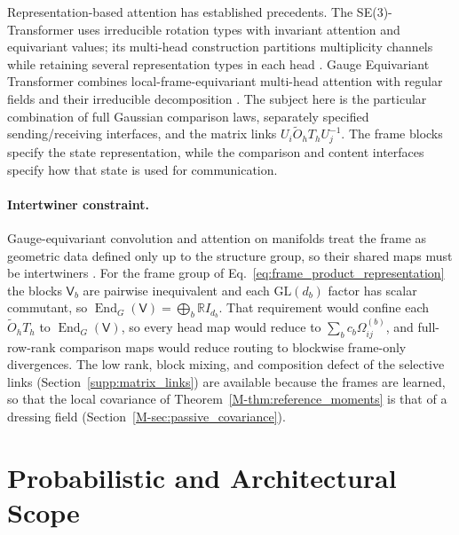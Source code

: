 \documentclass[twoside,11pt]{article}
\begin{document}
Representation-based attention has established precedents. The SE(3)-Transformer uses irreducible rotation types with invariant attention and equivariant values; its multi-head construction partitions multiplicity channels while retaining several representation types in each head \citep[Secs.~2.3 and 3.2, App.~D.3]{fuchs2020se3}. Gauge Equivariant Transformer combines local-frame-equivariant multi-head attention with regular fields and their irreducible decomposition \citep[Secs.~4.1--4.2]{He2021GaugeEquivariantTransformer}. The subject here is the particular combination of full Gaussian comparison laws, separately specified sending/receiving interfaces, and the matrix links $U_i\widetilde O_hT_hU_j^{-1}$. The frame blocks specify the state representation, while the comparison and content interfaces specify how that state is used for communication.

\paragraph{Intertwiner constraint.}
Gauge-equivariant convolution and attention on manifolds treat the frame as geometric data defined only up to the structure group, so their shared maps must be intertwiners \citetext{\citealp[Sec.~2.4]{cohen2019gauge}; \citealp[Secs.~4.3 and~4.4]{He2021GaugeEquivariantTransformer}}. For the frame group of Eq.~\eqref{eq:frame_product_representation} the blocks $\mathsf V_b$ are pairwise inequivalent and each $\mathrm{GL}(d_b)$ factor has scalar commutant, so $\operatorname{End}_G(\mathsf V)=\bigoplus_b\mathbb RI_{d_b}$. That requirement would confine each $\widetilde O_hT_h$ to $\operatorname{End}_G(\mathsf V)$, so every head map would reduce to $\sum_bc_b\Omega_{ij}^{(b)}$, and full-row-rank comparison maps would reduce routing to blockwise frame-only divergences. The low rank, block mixing, and composition defect of the selective links (Section~\ref{supp:matrix_links}) are available because the frames are learned, so that the local covariance of Theorem~\ref{M-thm:reference_moments} is that of a dressing field (Section~\ref{M-sec:passive_covariance}).

\section{Probabilistic and Architectural Scope}
\label{supp:scope}
\end{document}
